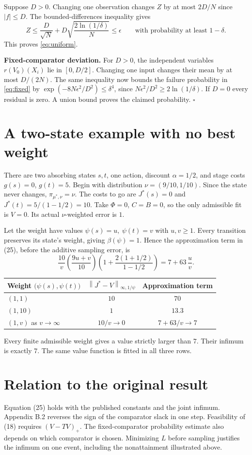 \documentclass[12pt,a4paper]{article}
\newcommand{\lead}[1]{\par\smallskip\noindent\textbf{#1}\enspace}
\newcommand{\piopt}{\pi_{\mu^*,\nu}}
\newcommand{\wn}[1]{\left\|#1\right\|_{\infty,1/\psi}}
\begin{document}
Suppose \(D>0\). Changing one observation changes \(Z\) by at most
\(2D/N\) since \(|f|\le D\). The bounded-differences inequality gives
\[
 Z\le\frac{D}{\sqrt N}+D\sqrt{\frac{2\ln(1/\delta)}{N}}\le\epsilon
 \qquad\text{with probability at least }1-\delta.
\]
This proves \eqref{eq:uniform}.

\lead{Fixed-comparator deviation.}
For \(D>0\), the independent variables \(r(V_0)(X_i)\) lie in \([0,D/2]\).
Changing one input changes their mean by at most \(D/(2N)\). The same
inequality now bounds the failure probability in \eqref{eq:fixed} by
\(\exp(-8N\epsilon^2/D^2)\le\delta^4\), since
\(N\epsilon^2/D^2\ge2\ln(1/\delta)\). If \(D=0\) every residual is zero.
A union bound proves the claimed probability. \hfill\(\square\)

\newpage
\section*{A two-state example with no best weight}
There are two absorbing states \(s,t\), one action, discount \(\alpha=1/2\),
and stage costs \(g(s)=0\), \(g(t)=5\). Begin with distribution
\(\nu=(9/10,1/10)\). Since the state never changes, \(\piopt=\nu\).
The costs to go are \(J^*(s)=0\) and \(J^*(t)=5/(1-1/2)=10\).
Take \(\Phi=0\), \(C=B=0\), so the only admissible fit is \(V=0\).
Its actual \(\nu\)-weighted error is \(1\).

Let the weight have values \(\psi(s)=u,\ \psi(t)=v\) with \(u,v\ge1\).
Every transition preserves its state's weight, giving \(\beta(\psi)=1\).
Hence the approximation term in (25), before the additive sampling error, is
\[
 \frac{10}{v}\left(\frac{9u+v}{10}\right)
       \left(1+\frac{2(1+1/2)}{1-1/2}\right)
       =7+63\,\frac{u}{v}.
\]
\begin{center}
\begin{tabular}{lcc}
Weight \(\bigl(\psi(s),\psi(t)\bigr)\) &
\(\wn{J^*-V}\) & Approximation term\\[3pt]\hline
\((1,1)\) & \(10\) & \(70\)\\
\((1,10)\) & \(1\) & \(13.3\)\\
\((1,v)\) as \(v\to\infty\) & \(10/v\to0\) & \(7+63/v\to7\)
\end{tabular}
\end{center}
Every finite admissible weight gives a value strictly larger than \(7\).
Their infimum is exactly \(7\). The same value function is fitted in
all three rows.

\section*{Relation to the original result}
Equation (25) holds with the published constants and the joint infimum.
Appendix B.2 reverses the sign of the comparator slack in one step.
Feasibility of (18) requires \((V-TV)_+\). The fixed-comparator
probability estimate also depends on which comparator is chosen.
Minimizing \(L\) before sampling justifies the infimum on one event,
including the nonattainment illustrated above.
\end{document}
